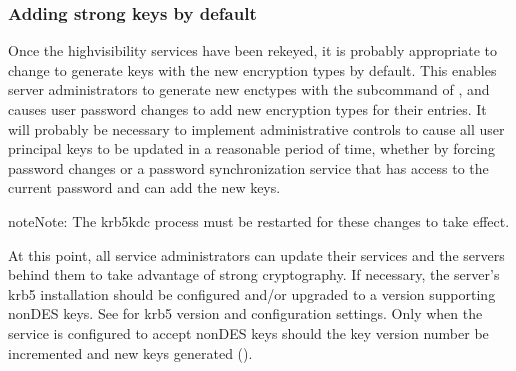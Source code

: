 \documentclass[letterpaper,10pt,english]{sphinxmanual}
\begin{document}
\subsubsection{Adding strong keys by default}
\label{\detokenize{admin/advanced/retiring-des:adding-strong-keys-by-default}}
\sphinxAtStartPar
Once the high\sphinxhyphen{}visibility services have been rekeyed, it is probably
appropriate to change {\hyperref[\detokenize{admin/conf_files/kdc_conf:kdc-conf-5}]{}} to generate keys with the new
encryption types by default.  This enables server administrators to generate
new enctypes with the  subcommand of {\hyperref[\detokenize{admin/admin_commands/k5srvutil:k5srvutil-1}]{}},
and causes user password
changes to add new encryption types for their entries.  It will probably
be necessary to implement administrative controls to cause all user
principal keys to be updated in a reasonable period of time, whether
by forcing password changes or a password synchronization service that
has access to the current password and can add the new keys.

\begin{sphinxVerbatim}[commandchars=\\\{\}]
\PYG{p}{[}\PYG{p}{]}
          
                      
\end{sphinxVerbatim}

\begin{sphinxadmonition}{note}{Note:}
\sphinxAtStartPar
The krb5kdc process must be restarted for these changes to take effect.
\end{sphinxadmonition}

\sphinxAtStartPar
At this point, all service administrators can update their services and the
servers behind them to take advantage of strong cryptography.
If necessary, the server’s krb5 installation should be configured and/or
upgraded to a version supporting non\sphinxhyphen{}DES keys.  See {\hyperref[\detokenize{admin/enctypes:enctypes}]{}} for
krb5 version and configuration settings.
Only when the service is configured to accept non\sphinxhyphen{}DES keys should
the key version number be incremented and new keys generated
().
\end{document}
